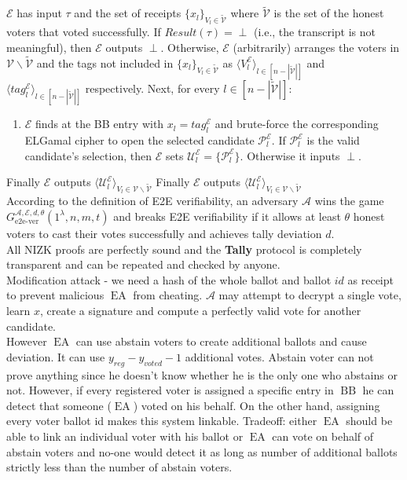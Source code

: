 \documentclass[12pt]{article}
\DeclareMathOperator{\ea}{EA}
\DeclareMathOperator{\bb}{BB}
\begin{document}
$\mathcal{E}$ has input $\tau$ and the set of receipts  $\{x_l\}_{V_l \in \tilde{\mathcal{V}}}$ where $\tilde{\mathcal{V}}$ is the set of the honest voters that voted successfully.  If $Result(\tau) = \perp$ (i.e., the transcript is not meaningful), then $\mathcal{E}$ outputs $\perp$. Otherwise, $\mathcal{E}$ (arbitrarily) arranges the voters in $\mathcal{V} \backslash \tilde{\mathcal{V}}$ and the tags not included in $\{x_l\}_{V_l \in \tilde{\mathcal{V}}}$ as $\langle V_l^{\mathcal{E}} \rangle_{l \in  [n - |\tilde{\mathcal{V}}|]}$ and $\langle tag_l^{\mathcal{E}} \rangle_{l \in  [n - |\tilde{\mathcal{V}}|]}$ respectively. Next, for every $l \in [n - |\tilde{\mathcal{V}}|]$:\\
\begin{enumerate}
\item  $\mathcal{E}$ finds at the BB entry with   $x_l = tag_l^{\mathcal{E}}$ and brute-force the corresponding ELGamal cipher to open the selected candidate $\mathcal{P}_l^{\mathcal{E}}$. If $\mathcal{P}_l^{\mathcal{E}}$ is the valid candidate's selection, then $\mathcal{E}$ sets $\mathcal{U}_l^{\mathcal{E}} = \{\mathcal{P}_l^{\mathcal{E}}\}$. Otherwise it inputs $\perp$.
\end{enumerate}
Finally $\mathcal{E}$ outputs  $\langle \mathcal{U}_l^{\mathcal{E}} \rangle_{V_l \in \mathcal{V} \backslash \tilde{\mathcal{V}}  }$
Finally $\mathcal{E}$ outputs  $\langle \mathcal{U}_l^{\mathcal{E}} \rangle_{V_l \in \mathcal{V} \backslash \tilde{\mathcal{V}}  }$\\

According to the definition of E2E verifiability, an adversary $\mathcal{A}$ wins the game $G^{\mathcal{A} ,\mathcal{E} ,d,\theta}_{\text{e2e-ver}} (1^{\lambda}, n,m,t)$ and breaks E2E verifiability if it allows at least $\theta$ honest voters to cast their votes successfully and achieves tally deviation $d$. \\

All NIZK proofs are perfectly sound and the \textbf{Tally} protocol is completely transparent and can be repeated and checked by anyone. \\
Modification attack - we need a hash of the whole ballot and ballot $id$ as receipt to prevent malicious $\ea$ from cheating. $\mathcal{A}$ may attempt to decrypt a single vote, learn $x$, create a signature and compute a perfectly valid vote for another candidate. \\

However $\ea$ can use abstain voters to create additional ballots and cause deviation. It can use $y_{reg} - y_{voted} -1$  additional votes. Abstain voter can not prove anything since he doesn't know whether he is the only one who abstains or not.  However, if every registered voter is assigned a specific entry in $\bb$ he can detect that someone ($\ea$) voted on his behalf. On the other hand, assigning every voter ballot id makes this system linkable. Tradeoff: either $\ea$ should be able to link an individual voter with his ballot or $\ea$ can vote on behalf of abstain voters and no-one would detect it as long as number of additional ballots strictly less than the number of abstain voters. 
 \nocite{*}


\end{document}
